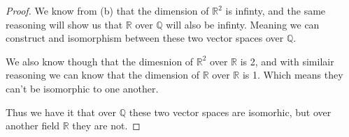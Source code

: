 \documentclass[12pt]{article}
\newcommand      {\Qm}         {{\mathbb Q}}
\newcommand      {\Rm}         {{\mathbb R}}
\begin{document}
\begin{itemize}
\begin{itemize}
\begin{proof}
            We know from (b) that the dimension of $\Rm^2$ is infinty, and the same reasoning will show us that $\Rm$ over $\Qm$ will also be infinty. Meaning we can construct and isomorphism between these two vector spaces over $\Qm$. 

            We also know though that the dimesnion of $\Rm^2$ over $\Rm$ is 2, and with similair reasoning we can know that the dimension of $\Rm$ over $\Rm$ is 1. Which means they can't be isomorphic to one another. 
            
            Thus we have it that over $\Qm$ these two vector spaces are isomorhic, but over another field $\Rm$ they are not.
        \end{proof} 
    \end{itemize}
\end{itemize}
\end{document}
